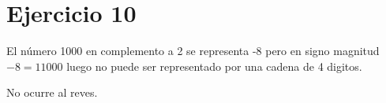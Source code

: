\section*{Ejercicio 10}

El número 1000 en complemento a 2 se representa -8 pero en signo magnitud $ -8 = 11000 $ luego no puede ser representado por una cadena de 4 digitos.

No ocurre al reves.